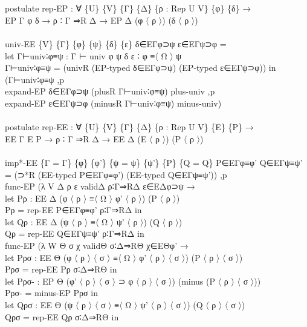 {\begin{code}
{\>\<\\
\>\<\\
\>postulate rep-EP : ∀ \{U\} \{V\} \{Γ\} \{Δ\} \{ρ : Rep U V\} \{φ\} \{δ\} →\<\\
\>                 EP Γ φ δ → ρ ∶ Γ ⇒R Δ → EP Δ (φ 〈 ρ 〉) (δ 〈 ρ 〉)\<\\
\>\<\\
\>univ-EE \{V\} \{Γ\} \{φ\} \{ψ\} \{δ\} \{ε\} δ∈EΓφ⊃ψ ε∈EΓψ⊃φ = \<\\
\>  let Γ⊢univ∶φ≡ψ : Γ ⊢ univ φ ψ δ ε ∶ φ ≡〈 Ω 〉 ψ\<\\
\>      Γ⊢univ∶φ≡ψ = (univR (EP-typed δ∈EΓφ⊃ψ) (EP-typed ε∈EΓψ⊃φ)) in\<\\
\>      (Γ⊢univ∶φ≡ψ ,p \<\\
\>      expand-EP δ∈EΓφ⊃ψ (plusR Γ⊢univ∶φ≡ψ) plus-univ ,p \<\\
\>      expand-EP ε∈EΓψ⊃φ (minusR Γ⊢univ∶φ≡ψ) minus-univ)\<\\
\>\<\\
\>postulate rep-EE : ∀ \{U\} \{V\} \{Γ\} \{Δ\} \{ρ : Rep U V\} \{E\} \{P\} →\<\\
\>                 EE Γ E P → ρ ∶ Γ ⇒R Δ → EE Δ (E 〈 ρ 〉) (P 〈 ρ 〉)\<\\
\>\<\\
\>imp*-EE \{Γ = Γ\} \{φ\} \{φ'\} \{ψ = ψ\} \{ψ'\} \{P\} \{Q = Q\} P∈EΓφ≡φ' Q∈EΓψ≡ψ' = (⊃*R (EE-typed P∈EΓφ≡φ') (EE-typed Q∈EΓψ≡ψ')) ,p \<\\
\>  func-EP (λ V Δ ρ ε validΔ ρ∶Γ⇒RΔ ε∈EΔφ⊃ψ →\<\\
\>    let Pρ : EE Δ (φ 〈 ρ 〉 ≡〈 Ω 〉 φ' 〈 ρ 〉) (P 〈 ρ 〉)\<\\
\>        Pρ = rep-EE P∈EΓφ≡φ' ρ∶Γ⇒RΔ in\<\\
\>    let Qρ : EE Δ (ψ 〈 ρ 〉 ≡〈 Ω 〉 ψ' 〈 ρ 〉) (Q 〈 ρ 〉)\<\\
\>        Qρ = rep-EE Q∈EΓψ≡ψ' ρ∶Γ⇒RΔ in\<\\
\>    func-EP (λ W Θ σ χ validΘ σ∶Δ⇒RΘ χ∈EΘφ' → \<\\
\>    let Pρσ : EE Θ (φ 〈 ρ 〉 〈 σ 〉 ≡〈 Ω 〉 φ' 〈 ρ 〉 〈 σ 〉) (P 〈 ρ 〉 〈 σ 〉)\<\\
\>        Pρσ = rep-EE Pρ σ∶Δ⇒RΘ in\<\\
\>    let Pρσ- : EP Θ (φ' 〈 ρ 〉 〈 σ 〉 ⊃ φ 〈 ρ 〉 〈 σ 〉) (minus (P 〈 ρ 〉 〈 σ 〉))\<\\
\>        Pρσ- = minus-EP Pρσ in\<\\
\>    let Qρσ : EE Θ (ψ 〈 ρ 〉 〈 σ 〉 ≡〈 Ω 〉 ψ' 〈 ρ 〉 〈 σ 〉) (Q 〈 ρ 〉 〈 σ 〉)\<\\
\>        Qρσ = rep-EE Qρ σ∶Δ⇒RΘ in\<\\
}
\end{code}}
